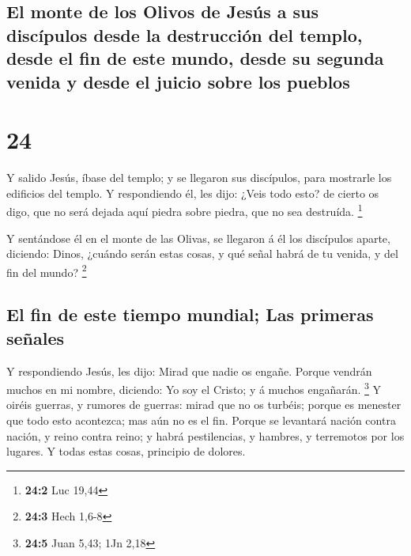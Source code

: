 \hypertarget{el-monte-de-los-olivos-de-jesuxfas-a-sus-discuxedpulos-desde-la-destrucciuxf3n-del-templo-desde-el-fin-de-este-mundo-desde-su-segunda-venida-y-desde-el-juicio-sobre-los-pueblos}{%
\subsection{El monte de los Olivos de Jesús a sus discípulos desde la
destrucción del templo, desde el fin de este mundo, desde su segunda
venida y desde el juicio sobre los
pueblos}\label{el-monte-de-los-olivos-de-jesuxfas-a-sus-discuxedpulos-desde-la-destrucciuxf3n-del-templo-desde-el-fin-de-este-mundo-desde-su-segunda-venida-y-desde-el-juicio-sobre-los-pueblos}}

\hypertarget{section-23}{%
\section{24}\label{section-23}}

 Y salido Jesús, íbase del templo; y se llegaron sus
discípulos, para mostrarle los edificios del templo.  Y
respondiendo él, les dijo: ¿Veis todo esto? de cierto os digo, que no
será dejada aquí piedra sobre piedra, que no sea destruída. \footnote{\textbf{24:2}
  Luc 19,44}

 Y sentándose él en el monte de las Olivas, se llegaron á
él los discípulos aparte, diciendo: Dinos, ¿cuándo serán estas cosas, y
qué señal habrá de tu venida, y del fin del mundo? \footnote{\textbf{24:3}
  Hech 1,6-8}

\hypertarget{el-fin-de-este-tiempo-mundial-las-primeras-seuxf1ales}{%
\subsection{El fin de este tiempo mundial; Las primeras
señales}\label{el-fin-de-este-tiempo-mundial-las-primeras-seuxf1ales}}

 Y respondiendo Jesús, les dijo: Mirad que nadie os
engañe.  Porque vendrán muchos en mi nombre, diciendo: Yo
soy el Cristo; y á muchos engañarán. \footnote{\textbf{24:5} Juan 5,43;
  1Jn 2,18}  Y oiréis guerras, y rumores de guerras: mirad
que no os turbéis; porque es menester que todo esto acontezca; mas aún
no es el fin.  Porque se levantará nación contra nación, y
reino contra reino; y habrá pestilencias, y hambres, y terremotos por
los lugares.  Y todas estas cosas, principio de dolores.

